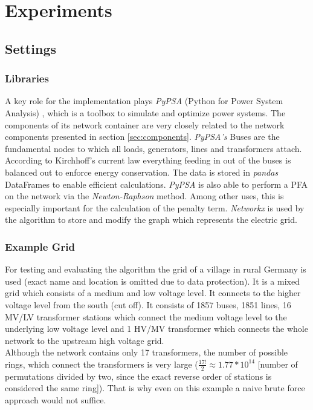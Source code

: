 \chapter{Experiments}\label{chap:experiments}

\section{Settings}
\subsection{Libraries}\label{pypsa}
A key role for the implementation plays \textit{PyPSA} (Python for Power System Analysis) \cite{brown2017pypsa}, which is a toolbox to simulate and optimize power systems. The components of its network container are very closely related to the network components presented in section \ref{sec:components}. \textit{PyPSA's} Buses are the fundamental nodes to which all loads, generators, lines and transformers attach. According to Kirchhoff's current law everything feeding in out of the buses is balanced out to enforce energy conservation. The data is stored in \textit{pandas} DataFrames to enable efficient calculations. \textit{PyPSA} is also able to perform a PFA on the network via the \textit{Newton-Raphson} method. Among other uses, this is especially important for the calculation of the penalty term. \textit{Networkx} is used by the algorithm to store and modify the graph which represents the electric grid.

\subsection{Example Grid}\label{sec:example_grid}
For testing and evaluating the algorithm the grid of a village in rural Germany is used (exact name and location is omitted due to data protection). It is a mixed grid which consists of a medium and low voltage level. It connects to the higher voltage level from the south (cut off). It consists of 1857 buses, 1851 lines, 16 MV/LV transformer stations which connect the medium voltage level to the underlying low voltage level and 1 HV/MV transformer which connects the whole network to the upstream high voltage grid. \\
Although the network contains only 17 transformers, the number of possible rings, which connect the transformers is very large ($\frac{17!}{2} \approx 1.77*10^{14}$ [number of permutations divided by two, since the exact reverse order of stations is considered the same ring]). That is why even on this example a naive brute force approach would not suffice.\\

